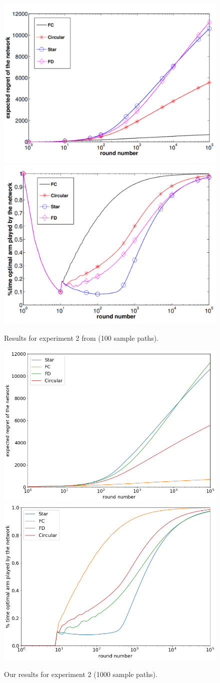 \documentclass{article}
\begin{document}
\begin{figure}[H]
  \centering
  \includegraphics[width=0.49\linewidth]{fig2_1.png}
  \includegraphics[width=0.49\linewidth]{fig2_2.png}
  \caption{Results for experiment 2 from \cite{DBLP:journals/corr/KollaJG16} (100 sample paths).}
\end{figure}

\begin{figure}[H]
  \centering
  \includegraphics[width=0.49\linewidth]{fig2_1_ours.png}
  \includegraphics[width=0.49\linewidth]{fig2_2_ours.png}
  \caption{Our results for experiment 2 (1000 sample paths).}
\end{figure}
\end{document}
